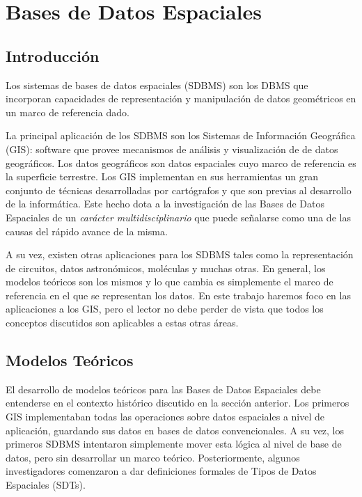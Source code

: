 \chapter{Bases de Datos Espaciales}  \label{cap:e}

\section{Introducción}

Los sistemas de bases de datos espaciales (SDBMS) son los DBMS que incorporan capacidades de representación y manipulación de
datos geométricos en un marco de referencia dado.

La principal aplicación de los SDBMS son los Sistemas de Información Geográfica (GIS): software que provee mecanismos de análisis
y visualización de de datos geográficos. Los datos geográficos son datos espaciales cuyo marco de referencia  es la superficie terrestre.
Los GIS implementan en sus herramientas un gran conjunto de técnicas desarrolladas por cartógrafos y que son previas al desarrollo de la informática.
Este hecho dota a la investigación de las Bases de Datos Espaciales de un \emph{carácter multidisciplinario} que puede señalarse como
una de las causas del rápido avance de la misma.

A su vez, existen otras aplicaciones para los SDBMS tales como la representación de circuitos, datos astronómicos, moléculas y muchas otras.
En general, los modelos teóricos son los mismos y lo que cambia es simplemente el marco de referencia en el que se representan los datos.
En este trabajo haremos foco en las aplicaciones a los GIS, pero el lector no debe perder de vista que todos los conceptos discutidos
son aplicables a estas otras áreas.

\section{Modelos Teóricos}

El desarrollo de modelos teóricos para las Bases de Datos Espaciales debe entenderse en el contexto histórico discutido en la sección anterior.
Los primeros GIS implementaban todas las operaciones sobre datos espaciales a nivel de aplicación,
guardando sus datos en bases de datos convencionales.
A su vez, los primeros SDBMS intentaron simplemente mover esta lógica al nivel de base de datos, pero sin desarrollar un marco teórico.
Posteriormente, algunos investigadores comenzaron a dar definiciones formales de Tipos de Datos Espaciales (SDTs).

